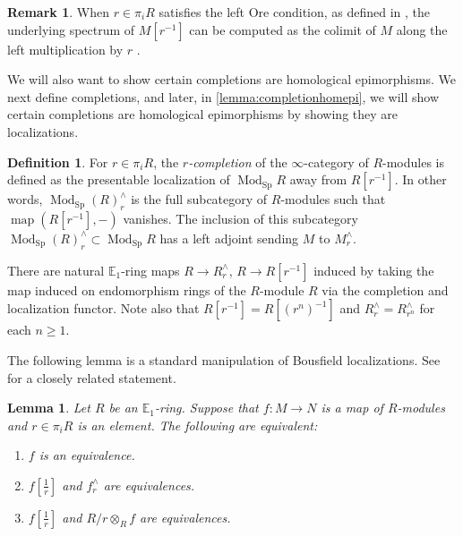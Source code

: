 \documentclass[12 pt]{amsart}
\theoremstyle{plain}
\newtheorem{lemma}[theorem]{Lemma}
\theoremstyle{definition}
\newtheorem{definition}[theorem]{Definition}
\newtheorem{remark}[theorem]{Remark}
\theoremstyle{remark}
\numberwithin{equation}{section}
\DeclareMathOperator\Sp{Sp}
\DeclareMathOperator\Mod{Mod}
\DeclareMathOperator\map{map}
\newcommand\EE{\mathbb{E}}
\DeclareMathOperator\colim{colim}
\begin{document}
\begin{remark}
	\label{remark:ore-implies-colimit}
	When $r\in \pi_iR$ satisfies the left Ore condition, as defined in \cite[Definition
	7.2.3.1]{HA},
	the underlying spectrum of $M[r^{-1}]$ can be computed as the colimit of $M$ along the left multiplication by $r$ \cite[Proposition 7.2.3.20]{HA}. 
\end{remark}

We will also want to show certain completions are homological epimorphisms. We
next define completions, and later, in 
\autoref{lemma:completionhomepi}, we will show certain completions are
homological epimorphisms by showing they are localizations.
\begin{definition}
	\label{definition:} For $r \in \pi_iR$, the {\em $r$-completion}
of the $\infty$-category of $R$-modules is defined as the presentable localization of $\Mod_{\Sp}R$ away from $R[r^{-1}]$. In other words, $\Mod_{\Sp}(R)^{\wedge}_r$ is the 
full
subcategory of $R$-modules such that $\map(R[r^{-1}],-)$ vanishes. The inclusion of this subcategory 
$\Mod_{\Sp}(R)^{\wedge}_r \subset \Mod_{\Sp}R$
has a left adjoint sending $M$ to $M^{\wedge}_r$. \end{definition}


There are natural $\EE_1$-ring maps $R\to R^{\wedge}_r$, $R\to R[r^{-1}]$ induced by taking the map induced on endomorphism rings of the $R$-module $R$ via the completion and localization functor. Note also that $R[r^{-1}]=R[(r^{n})^{-1}]$ and $R^{\wedge}_r=R^{\wedge}_{r^n}$ for each $n\geq1$.

The following lemma is a standard manipulation of Bousfield localizations. See
\cite[Lemma 1.34]{ravenel1984localization} for a closely related statement.
\begin{lemma}\label{lemma:invertandcomplete}
	Let $R$ be an $\EE_1$-ring.	
	Suppose that $f:M \to N$ is a map of $R$-modules and $r \in \pi_iR$ is an element. The following are equivalent:
	
	\begin{enumerate}
		\item $f$ is an equivalence.
		\item $f[\frac 1 r]$ and $f^{\wedge}_r$ are equivalences.
		\item $f[\frac 1 r]$ and $R/r\otimes_Rf$ are equivalences.
	\end{enumerate}
\end{lemma}
\end{document}

